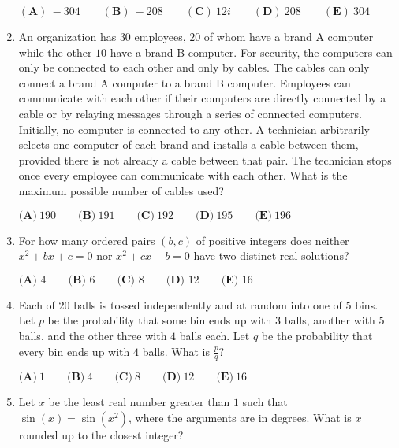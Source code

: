 \documentclass{article}
\begin{document}
\begin{enumerate}[label=\arabic*., itemsep=0.5em]
\((\textbf{A})\: {-}304\qquad(\textbf{B}) \: {-}208\qquad(\textbf{C}) \: 12i\qquad(\textbf{D}) \: 208\qquad(\textbf{E}) \: 304\)\par \vspace{0.5em}\item An organization has \(30\) employees, \(20\) of whom have a brand A computer while the other \(10\) have a brand B computer. For security, the computers can only be connected to each other and only by cables. The cables can only connect a brand A computer to a brand B computer. Employees can communicate with each other if their computers are directly connected by a cable or by relaying messages through a series of connected computers. Initially, no computer is connected to any other. A technician arbitrarily selects one computer of each brand and installs a cable between them, provided there is not already a cable between that pair. The technician stops once every employee can communicate with each other. What is the maximum possible number of cables used?

\(\textbf{(A)}\ 190  \qquad\textbf{(B)}\  191 \qquad\textbf{(C)}\  192 \qquad\textbf{(D)}\
 195 \qquad\textbf{(E)}\ 196\)\par \vspace{0.5em}\item For how many ordered pairs \((b,c)\) of positive integers does neither \(x^2+bx+c=0\) nor \(x^2+cx+b=0\) have two distinct real solutions?

\(\textbf{(A) } 4 \qquad \textbf{(B) } 6 \qquad \textbf{(C) } 8 \qquad \textbf{(D) } 12 \qquad \textbf{(E) } 16 \qquad\)\par \vspace{0.5em}\item Each of \(20\) balls is tossed independently and at random into one of \(5\) bins. Let \(p\) be the probability that some bin ends up with \(3\) balls, another with \(5\) balls, and the other three with \(4\) balls each. Let \(q\) be the probability that every bin ends up with \(4\) balls. What is \(\frac{p}{q}\)?

\(\textbf{(A)}\ 1 \qquad\textbf{(B)}\  4 \qquad\textbf{(C)}\  8 \qquad\textbf{(D)}\  12 \qquad\textbf{(E)}\ 16\)\par \vspace{0.5em}\item Let \(x\) be the least real number greater than \(1\) such that \(\sin(x) = \sin(x^2)\), where the arguments are in degrees. What is \(x\) rounded up to the closest integer?


\end{enumerate}
\end{document}
